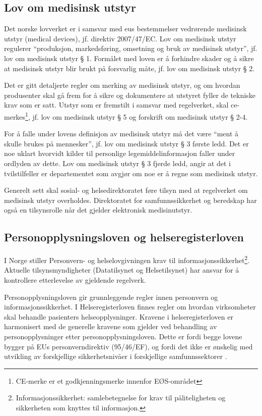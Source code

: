 \subsection{Lov om medisinsk utstyr}
Det norske lovverket er i samsvar med \acrshort{eu}s bestemmelser vedrørende medisinsk utstyr (medical devices), jf. direktiv 2007/47/EC. Lov om medisinsk utstyr regulerer “produksjon, markedsføring, omsetning og bruk av medisinsk utstyr”, jf. lov om medisinsk utstyr § 1. Formålet med loven er å forhindre skader og å sikre at medisinsk utstyr blir brukt på forsvarlig måte, jf. lov om medisinsk utstyr § 2.

Det er gitt detaljerte regler om merking av medisinsk utstyr, og om hvordan produsenter skal gå frem for å sikre og dokumentere at utstyret fyller de tekniske krav som er satt. Utstyr som er fremstilt i samsvar med regelverket, skal \acrshort{ce}-merkes\footnote{CE-merke er et godkjenningsmerke innenfor EØS-området}, jf. lov om medisinsk utstyr § 5 og forskrift om medisinsk utstyr § 2-4.

For å falle under lovens definisjon av medisinsk utstyr må det være “ment å skulle brukes på mennesker”, jf. lov om medisinsk utstyr § 3 første ledd. Det er noe uklart hvorvidt kilder til personlige legemiddelinformasjon faller under ordlyden av dette. Lov om medisinsk utstyr § 3 fjerde ledd, angir at det i tvilstilfeller er departementet som avgjør om noe er å regne som medisinsk utstyr.
 
Generelt sett skal sosial- og helsedirektoratet føre tilsyn med at regelverket om medisinsk utstyr overholdes. Direktoratet for samfunnssikkerhet og beredskap har også en tilsynsrolle når det gjelder elektronisk medisinutstyr.

\subsection{Personopplysningsloven og helseregisterloven}
I Norge stiller Personvern- og helselovgivningen krav til informasjonssikkerhet\footnote{Informasjonssikkerhet: samlebetegnelse for krav til påliteligheten og sikkerheten som knyttes til informasjon.}. Aktuelle tilsynsmyndigheter (Datatilsynet og Helsetilsynet) har ansvar for å kontrollere etterlevelse av gjeldende regelverk.
 
Personopplysningsloven gir grunnleggende regler innen personvern og informasjonssikkerhet. I Helseregisterloven finnes regler om hvordan virksomheter skal behandle pasienters helseopplysninger. Kravene i helseregisterloven er harmonisert med de generelle kravene som gjelder ved behandling av personopplysninger etter personopplysningsloven. Dette er fordi begge lovene bygger på EUs personverndirektiv (95/46/EF), og fordi det ikke er ønskelig med utvikling av forskjellige sikkerhetsnivåer i forskjellige samfunnssektorer \citep{kommentarutgaveHelseregisterloven}.
 
